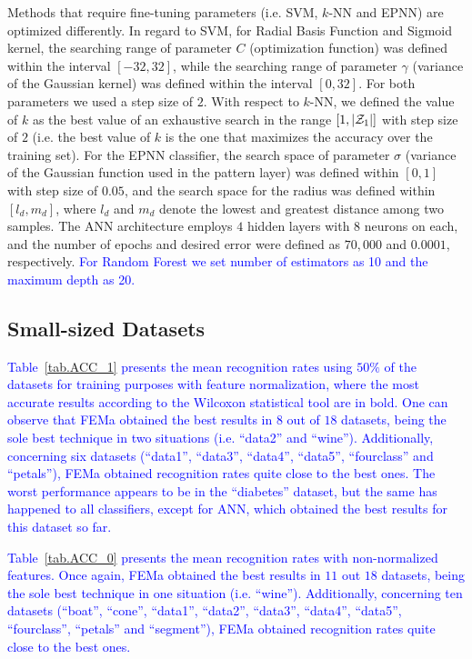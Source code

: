 Methods that require fine-tuning parameters (i.e. SVM, $k$-NN and EPNN) are optimized differently. In regard to SVM, for Radial Basis Function and Sigmoid kernel, the searching range of parameter $C$ (optimization function) was defined within the interval $[-32, 32]$, while the searching range of parameter $\gamma$ (variance of the Gaussian kernel) was defined within the interval $[0, 32]$. For both parameters we used a step size of $2$. With respect to $k$-NN, we defined the value of $k$ as the best value of an exhaustive search in the range $[1,|{\cal{Z}}_{1}|]$ with step size of $2$ (i.e. the best value of $k$ is the one that maximizes the accuracy over the training set). For the EPNN classifier, the search space of parameter $\sigma$ (variance of the Gaussian function used in the pattern layer) was defined within $[0,1]$ with step size of $0.05$, and the search space for the radius was defined within $[l_d,m_d]$, where $l_d$ and $m_d$ denote the lowest and greatest distance among two samples. The ANN architecture employs $4$ hidden layers with $8$ neurons on each, and the number of epochs and desired error were defined as $70,000$ and $0.0001$, respectively. \textcolor{blue}{For Random Forest we set number of estimators as 10 and the maximum depth as 20.} 

\subsection{Small-sized Datasets}
\label{ss.small}

\textcolor{blue}{Table~\ref{tab.ACC_1} presents the mean recognition rates using $50\%$ of the datasets for training purposes with feature normalization, where the most accurate results according to the Wilcoxon statistical tool are in bold. One can observe that FEMa obtained the best results in $8$ out of $18$ datasets, being the sole best technique in two situations (i.e. ``data2'' and ``wine''). Additionally, concerning six datasets (``data1'',  ``data3'', ``data4'', ``data5'', ``fourclass'' and ``petals''), FEMa obtained recognition rates quite close to the best ones. The worst performance appears to be in the ``diabetes'' dataset, but the same has happened to all classifiers, except for ANN, which obtained the best results for this dataset so far.}





\textcolor{blue}{Table~\ref{tab.ACC_0} presents the mean recognition rates with non-normalized features. Once again, FEMa obtained the best results in $11$ out $18$ datasets, being the sole best technique in one situation (i.e. ``wine''). Additionally, concerning ten datasets (``boat'', ``cone'', ``data1'', ``data2'',  ``data3'', ``data4'', ``data5'', ``fourclass'', ``petals'' and ``segment''), FEMa obtained recognition rates quite close to the best ones.}

